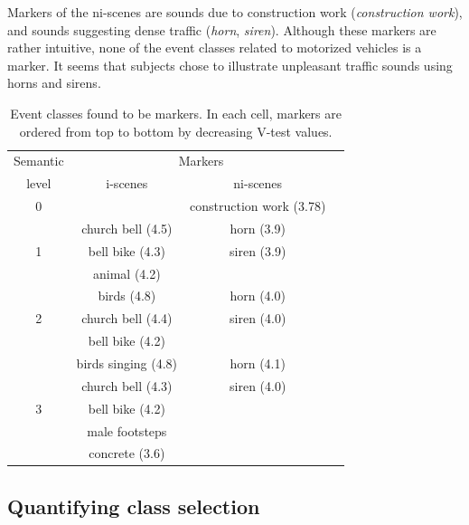 \documentclass[twoside,twocolumn]{article}
\begin{document}
Markers of the ni-scenes are sounds due to construction work (\textit{construction work}), and sounds suggesting dense traffic (\textit{horn}, \textit{siren}). Although these markers are rather intuitive, none of the event classes related to motorized vehicles is a marker. It seems that subjects chose to illustrate unpleasant traffic sounds using horns and sirens.

\begin{table}[t]
 \setlength{\tabcolsep}{0.2pt}
 \centering
  {\renewcommand{\arraystretch}{0.9}
\begin{tabular}{c c c c} 
Semantic   &  \multicolumn{2}{c}{Markers} \\
level & i-scenes & ni-scenes \\
\hline
0  &                               &  construction work (3.78)  \\
\hline
  & church bell  (4.5)             & horn  (3.9) \\
1 & bell bike    (4.3)             & siren (3.9)\\
  & animal       (4.2)             &       \\
   \hline
  & birds        (4.8)             & horn  (4.0)\\
2 & church bell  (4.4)             & siren (4.0)\\
  & bell bike    (4.2)             &       \\
   \hline
  & birds singing (4.8)            & horn  (4.1)\\
  & church bell   (4.3)            & siren (4.0)\\
3 & bell bike     (4.2)            &       \\
  & male footsteps                 &  \\
  &   concrete (3.6)               &  \\
  \hline
\end{tabular}
}
\vspace{0.5mm}
\caption{\label{tab:markers} Event classes found to be markers. In each cell, markers are ordered from top to bottom by decreasing V-test values.}
\end{table}

\subsection{Quantifying class selection}
\label{sec:QuantifyingClassSelection}
\end{document}
